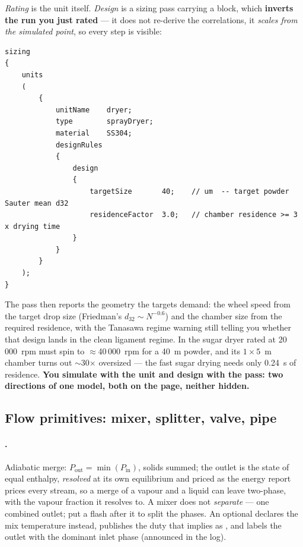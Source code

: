 \documentclass[11pt,a4paper]{article}
\begin{document}
\emph{Rating} is the  unit itself.  \emph{Design} is a
 sizing pass carrying a  block, which
\textbf{inverts the run you just rated} --- it does not re-derive the
correlations, it \emph{scales from the simulated point}, so every step
is visible:

\begin{lstlisting}[language=dict]
sizing
{
    units
    (
        {
            unitName    dryer;
            type        sprayDryer;
            material    SS304;
            designRules
            {
                design
                {
                    targetSize       40;    // um  -- target powder Sauter mean d32
                    residenceFactor  3.0;   // chamber residence >= 3 x drying time
                }
            }
        }
    );
}
\end{lstlisting}

The pass then reports the geometry the targets demand: the wheel speed
from the target drop size (Friedman's $d_{32}\!\sim\!N^{-0.6}$) and the
chamber size from the required residence, with the Tanasawa regime
warning still telling you whether that design lands in the clean
ligament regime.  In 
the sugar dryer rated at 20\,000~rpm must spin to $\approx$40\,000~rpm
for a 40~\textmu m powder, and its $1\times5$~m chamber turns out
$\sim$30$\times$ oversized --- the fast sugar drying needs only 0.24~s
of residence.  \textbf{You simulate with the unit and design with the
pass: two directions of one model, both on the page, neither hidden.}

\subsection{Flow primitives: mixer, splitter, valve, pipe}\label{sec:primitives}

\paragraph{.}  Adiabatic merge:
$P_{\mathrm{out}} = \min(P_{\mathrm{in}})$, solids summed; the outlet is
the state of equal enthalpy, \emph{resolved} at its own equilibrium and
priced as the energy report prices every stream, so a merge of a vapour
and a liquid can leave two-phase, with the vapour fraction it resolves to.
A mixer does not \emph{separate} --- one combined outlet; put a flash
after it to split the phases.  An optional 
declares the mix temperature instead, publishes the duty that implies as
, and labels the outlet with the dominant inlet phase
(announced in the log).
\end{document}

